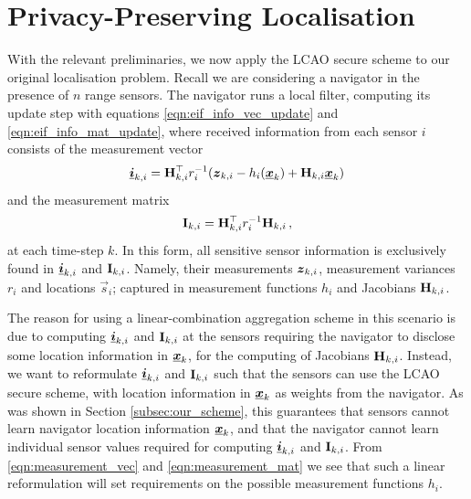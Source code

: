\documentclass[twocolumn]{autart}
\begin{document}
% 
%                                
%                                
%                                
% 

\section{Privacy-Preserving Localisation} \label{sec:priv_localisation}
With the relevant preliminaries, we now apply the LCAO secure scheme to our original localisation problem. Recall we are considering a navigator in the presence of $n$ range sensors. The navigator runs a local filter, computing its update step with equations \eqref{eqn:eif_info_vec_update} and \eqref{eqn:eif_info_mat_update}, where received information from each sensor $i$ consists of the measurement vector
\begin{equation}
    {\boldsymbol{\underline{i}}}_{k,i} = {{\mathbf{H}}}^\top_{k,i} r^{-1}_i ({\boldsymbol{z}}_{k,i} - h_i({\boldsymbol{\underline{x}}}_k) + {{\mathbf{H}}}_{k,i}{\boldsymbol{\underline{x}}}_k) \label{eqn:measurement_vec}
\end{equation}
and the measurement matrix
\begin{equation}
    {\ensuremath{{\mathbf{I}}}}_{k,i} = {{\mathbf{H}}}^\top_{k,i} r^{-1}_i {{\mathbf{H}}}_{k,i}\,, \label{eqn:measurement_mat}
\end{equation}
at each time-step $k$. In this form, all sensitive sensor information is exclusively found in ${\boldsymbol{\underline{i}}}_{k,i}$ and ${{\mathbf{I}}}_{k,i}$. Namely, their measurements ${\boldsymbol{z}}_{k,i}$, measurement variances $r_i$ and locations $\vec{s}_i$; captured in measurement functions $h_i$ and Jacobians ${{\mathbf{H}}}_{k,i}$. 

The reason for using a linear-combination aggregation scheme in this scenario is due to computing ${\boldsymbol{\underline{i}}}_{k,i}$ and ${{\mathbf{I}}}_{k,i}$ at the sensors requiring the navigator to disclose some location information in ${\boldsymbol{\underline{x}}}_k$, for the computing of Jacobians ${{\mathbf{H}}}_{k,i}$. Instead, we want to reformulate ${\boldsymbol{\underline{i}}}_{k,i}$ and ${{\mathbf{I}}}_{k,i}$ such that the sensors can use the LCAO secure scheme, with location information in ${\boldsymbol{\underline{x}}}_k$ as weights from the navigator. As was shown in Section \ref{subsec:our_scheme}, this guarantees that sensors cannot learn navigator location information ${\boldsymbol{\underline{x}}}_k$, and that the navigator cannot learn individual sensor values required for computing ${\boldsymbol{\underline{i}}}_{k,i}$ and ${{\mathbf{I}}}_{k,i}$. From \eqref{eqn:measurement_vec} and \eqref{eqn:measurement_mat} we see that such a linear reformulation will set requirements on the possible measurement functions $h_i$. 
\end{document}
